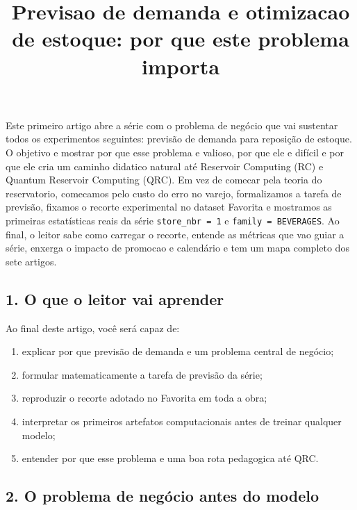\documentclass[12pt]{article}
\title{Previsao de demanda e otimizacao de estoque: por que este problema importa}
\author{}
\providecommand{\tightlist}{%
          \setlength{\itemsep}{0pt}\setlength{\parskip}{0pt}}
\begin{document}
        \maketitle

        \begin{resumo}
        Este primeiro artigo abre a série com o problema de negócio que vai sustentar todos os experimentos seguintes: previsão de demanda para reposição de estoque. O objetivo e mostrar por que esse problema e valioso, por que ele e difícil e por que ele cria um caminho didatico natural até Reservoir Computing (RC) e Quantum Reservoir Computing (QRC). Em vez de comecar pela teoria do reservatorio, comecamos pelo custo do erro no varejo, formalizamos a tarefa de previsão, fixamos o recorte experimental no dataset Favorita e mostramos as primeiras estatísticas reais da série \texttt{store\_nbr\ =\ 1} e \texttt{family\ =\ BEVERAGES}. Ao final, o leitor sabe como carregar o recorte, entende as métricas que vao guiar a série, enxerga o impacto de promocao e calendário e tem um mapa completo dos sete artigos.
        \end{resumo}

        \subsection{1. O que o leitor vai aprender}\label{1-o-que-o-leitor-vai-aprender}

Ao final deste artigo, você será capaz de:

\begin{enumerate}
\def\labelenumi{\arabic{enumi}.}
\tightlist
\item
  explicar por que previsão de demanda e um problema central de negócio;
\item
  formular matematicamente a tarefa de previsão da série;
\item
  reproduzir o recorte adotado no Favorita em toda a obra;
\item
  interpretar os primeiros artefatos computacionais antes de treinar qualquer modelo;
\item
  entender por que esse problema e uma boa rota pedagogica até QRC.
\end{enumerate}

\subsection{2. O problema de negócio antes do modelo}\label{2-o-problema-de-neguxf3cio-antes-do-modelo}
\end{document}
